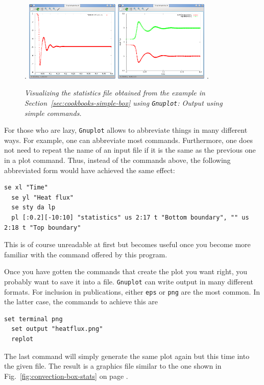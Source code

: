 \documentclass{article}
\begin{document}
\begin{figure}
  \centering
  \phantom.
  \hfill
  \includegraphics[width=0.4\textwidth]{viz/statistics/1}
  \hfill
  \includegraphics[width=0.4\textwidth]{viz/statistics/2}
  \hfill
  \phantom.
  \caption{\it Visualizing the statistics file obtained from the example in 
    Section~\ref{sec:cookbooks-simple-box} using \texttt{Gnuplot}: Output
    using simple commands.}
  \label{fig:viz-gnuplot-1}
\end{figure}

For those who are lazy, \texttt{Gnuplot} allows to abbreviate things in many
different ways. For example, one can abbreviate most commands. Furthermore,
one does not need to repeat the name of an input file if it is the same
as the previous one in a plot command. Thus, instead of the commands above,
the following abbreviated form would have achieved the same effect:
\begin{lstlisting}[frame=single,language=gnuplot]
  se xl "Time"
  se yl "Heat flux"
  se sty da lp
  pl [:0.2][-10:10] "statistics" us 2:17 t "Bottom boundary", "" us 2:18 t "Top boundary"
\end{lstlisting}
This is of course unreadable at first but becomes useful once you become
more familiar with the command offered by this program.

Once you have gotten the commands that create the plot you want right, you probably
want to save it into a file. \texttt{Gnuplot} can write output in many
different formats. For inclusion in publications, either \texttt{eps} or
\texttt{png} are the most common. In the latter case, the commands to
achieve this are
\begin{lstlisting}[frame=single,language=gnuplot]
  set terminal png
  set output "heatflux.png"
  replot
\end{lstlisting}
The last command will simply generate the same plot again but this time
into the given file. The result is a graphics file similar to the one
shown in Fig.~\ref{fig:convection-box-stats} on page \pageref{fig:convection-box-stats}.
\end{document}
